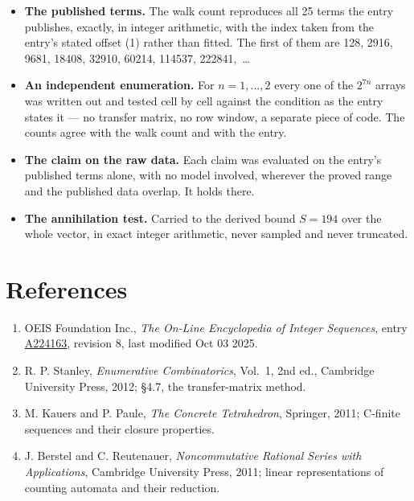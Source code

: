 \documentclass[11pt]{article}
\theoremstyle{definition}
\begin{document}
\begin{itemize}

\item {\bfseries The published terms.} The walk count reproduces all 25 terms the entry publishes, exactly, in integer arithmetic, with the index taken from the entry's stated offset (1) rather than fitted. The first of them are 128, 2916, 9681, 18408, 32910, 60214, 114537, 222841,~\dots

\item {\bfseries An independent enumeration.} For $n = 1,\dots,2$ every one of the $2^{7n}$ arrays was written out and tested cell by cell against the condition as the entry states it --- no transfer matrix, no row window, a separate piece of code. The counts agree with the walk count and with the entry.

\item {\bfseries The claim on the raw data.} Each claim was evaluated on the entry's published terms alone, with no model involved, wherever the proved range and the published data overlap. It holds there.

\item {\bfseries The annihilation test.} Carried to the derived bound $S = 194$ over the whole vector, in exact integer arithmetic, never sampled and never truncated.

\end{itemize}

\section{References}

\begin{enumerate}

\item OEIS Foundation Inc., \emph{The On-Line Encyclopedia of Integer Sequences}, entry \href{https://oeis.org/A224163}{A224163}, revision 8, last modified Oct 03 2025.

\item R. P. Stanley, \emph{Enumerative Combinatorics}, Vol.~1, 2nd ed., Cambridge University Press, 2012; \S4.7, the transfer-matrix method.

\item M. Kauers and P. Paule, \emph{The Concrete Tetrahedron}, Springer, 2011; C-finite sequences and their closure properties.

\item J. Berstel and C. Reutenauer, \emph{Noncommutative Rational Series with Applications}, Cambridge University Press, 2011; linear representations of counting automata and their reduction.

\end{enumerate}
\end{document}
